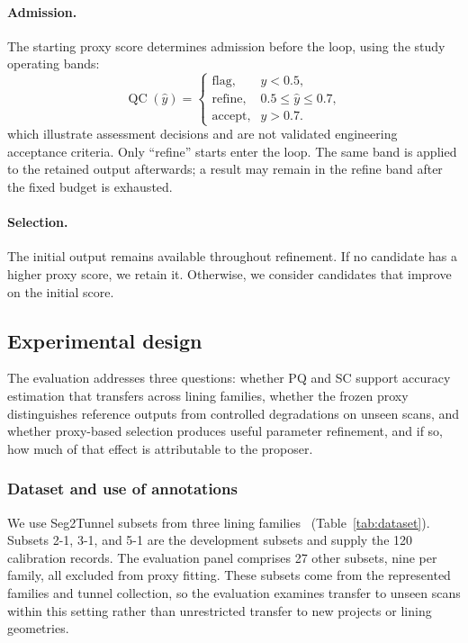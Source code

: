 \documentclass[a4paper,fleqn]{cas-dc}
\begin{document}
\paragraph{Admission.}
The starting proxy score determines admission before the loop,
using the study operating bands:
\begin{equation}
\operatorname{QC}(\hat y)=
\begin{cases}
\text{flag}, & \hat y<0.5,\\
\text{refine}, & 0.5\le\hat y\le0.7,\\
\text{accept}, & \hat y>0.7.
\end{cases}
\label{eq:qc-bands}
\end{equation}
which illustrate assessment decisions and are not validated engineering acceptance criteria. Only ``refine'' starts enter the loop. The same band is applied to the retained output afterwards; a result may remain in the refine band after the fixed budget is exhausted. \paragraph{Selection.}
The initial output remains available throughout refinement. If no candidate has a higher proxy score, we retain it. Otherwise, we consider candidates that improve on the initial score. 

\subsection{Experimental design}
\label{sec:exp-setup}

The evaluation addresses three questions: whether PQ and SC support accuracy estimation that transfers across lining families, whether the frozen proxy distinguishes reference outputs from controlled degradations on unseen scans, and whether proxy-based selection produces useful parameter refinement, and if so, how much of that effect is attributable to the proposer.

\subsubsection{Dataset and use of annotations}
\label{sec:dataset}

We use Seg2Tunnel subsets from three lining families~\cite{lin2024seg2tunnel} (Table~\ref{tab:dataset}). Subsets 2-1, 3-1, and 5-1 are the development subsets and supply the 120 calibration records. The evaluation panel comprises 27 other subsets, nine per family, all excluded from proxy fitting. These subsets come from the represented families and tunnel collection, so the evaluation examines transfer to unseen scans within this setting rather than unrestricted transfer to new projects or lining geometries.
\end{document}
